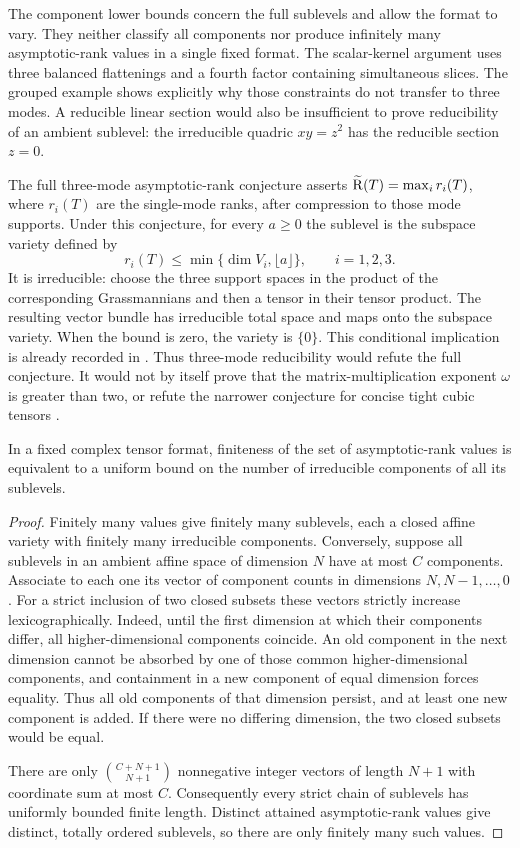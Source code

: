 The component lower bounds concern the full sublevels and allow the
format to vary. They neither classify all components nor produce
infinitely many asymptotic-rank values in a single fixed format.
The scalar-kernel argument uses three balanced flattenings and a
fourth factor containing simultaneous slices. The grouped example
shows explicitly why those constraints do not transfer to three
modes. A reducible linear section would also be insufficient to
prove reducibility of an ambient sublevel: the irreducible quadric
$xy=z^2$ has the reducible section $z=0$.

The full three-mode asymptotic-rank conjecture asserts
$\widetilde{\mathrm R}(T)=\max_i r_i(T)$, where $r_i(T)$ are the single-mode ranks,
after compression to those mode supports. Under this conjecture,
for every $a\geq0$ the sublevel is the subspace variety defined by
\[
 r_i(T)\leq\min\{\dim V_i,\lfloor a\rfloor\},\qquad i=1,2,3.
\]
It is irreducible: choose the three support spaces in the product
of the corresponding Grassmannians and then a tensor in their
tensor product. The resulting vector bundle has irreducible total
space and maps onto the subspace variety. When the bound is zero,
the variety is $\{0\}$. This conditional implication is already
recorded in \cite[Section~5]{CHNVZ2024}. Thus three-mode
reducibility would refute the full conjecture. It would not by
itself prove that the matrix-multiplication exponent $\omega$ is
greater than two, or refute the narrower conjecture for concise
tight cubic tensors \cite[Conjectures~3 and~8]{BjorklundKaski2023}.

\begin{proposition}\label{prop:components-finite-values}
In a fixed complex tensor format, finiteness of the set of
asymptotic-rank values is equivalent to a uniform bound on the
number of irreducible components of all its sublevels.
\end{proposition}

\begin{proof}
Finitely many values give finitely many sublevels, each a closed
affine variety with finitely many irreducible components.
Conversely, suppose all sublevels in an ambient affine space of
dimension $N$ have at most $C$ components. Associate to each one
its vector of component counts in dimensions $N,N-1,\ldots,0$.
For a strict inclusion of two closed subsets these vectors
strictly increase lexicographically. Indeed, until the first
dimension at which their components differ, all higher-dimensional
components coincide. An old component in the next dimension
cannot be absorbed by one of those common higher-dimensional
components, and containment in a new component of equal dimension
forces equality. Thus all old components of that dimension persist,
and at least one new component is added. If there were no differing
dimension, the two closed subsets would be equal.

There are only $\binom{C+N+1}{N+1}$ nonnegative integer vectors of
length $N+1$ with coordinate sum at most $C$. Consequently every
strict chain of sublevels has uniformly bounded finite length.
Distinct attained asymptotic-rank values give distinct, totally
ordered sublevels, so there are only finitely many such values.
\end{proof}

